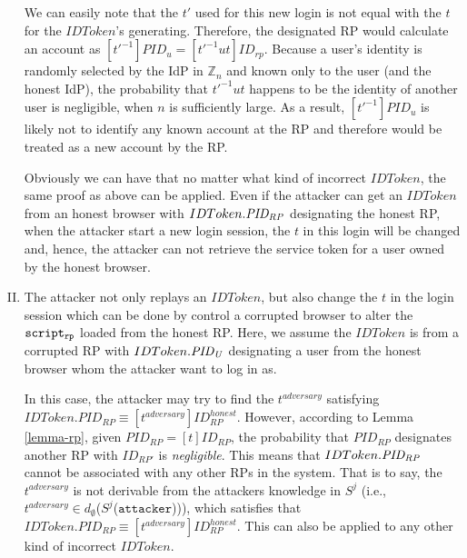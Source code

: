\begin{theorem}
\begin{enumerate}[I.]
      We can easily note that the $t'$ used for this new login 
      is not equal with the $t$ for the $IDToken$'s generating.
      Therefore, the designated RP would calculate an 
      account as $[t'^{-1}]PID_u = [t'^{-1}ut]ID_{rp}$.
      Because a user's identity is randomly selected by the IdP 
      in $\mathbb{Z}_n$ and known only to the user (and the honest 
      IdP), the probability that $t'^{-1}ut$ happens to be the 
      identity of another user is negligible, when $n$ is 
      sufficiently large. As a result, $[t'^{-1}]PID_u$ is likely 
      not to identify any known account at the RP and therefore 
      would be treated as a new account by the RP.

      Obviously we can have that no matter what kind of 
      incorrect $IDToken$, the same proof as above can be applied.
      Even if the attacker can get an $IDToken$ from an honest 
      browser with $IDToken.\mathit{PID_{RP}}$ designating the 
      honest RP, when the attacker start a new login session, 
      the $t$ in this login will be changed and, hence, the 
      attacker can not retrieve the service token for a user 
      owned by the honest browser.

    \item The attacker not only replays an $IDToken$, but also 
      change the $t$ in the login session which can be done by 
      control a corrupted browser to alter the $\mathtt{script_{rp}}$ 
      loaded from the honest RP. Here, 
      we assume the $IDToken$ is from a corrupted RP with 
      $IDToken.\mathit{PID_{U}}$ designating a user from the honest 
      browser whom the attacker want to log in as.

      In this case, the attacker may try to find the 
      $t^{adversary}$ satisfying $IDToken.PID_{RP} \equiv 
      [t^{adversary}]ID_{RP}^{honest}$.
      However, according to Lemma \ref{lemma-rp}, given 
      $PID_{RP} = [t]ID_{RP}$, the probability that $PID_{RP}$ 
      designates another RP with $ID_{RP'}$ is \emph{negligible}. 
      This means that $IDToken.\mathit{PID_{RP}}$ cannot be 
      associated with any other RPs in the system. 
      That is to say, the $t^{adversary}$ is not derivable from 
      the attackers knowledge in $S^j$ (i.e., $t^{adversary} \in d_{\emptyset}$($S^j$($\mathtt{attacker}$))), 
      which satisfies that $IDToken.PID_{RP} \equiv [t^{adversary}]ID_{RP}^{honest}$.
      This can also be applied to any other kind of incorrect $IDToken$.
  \end{enumerate}


\end{theorem}
